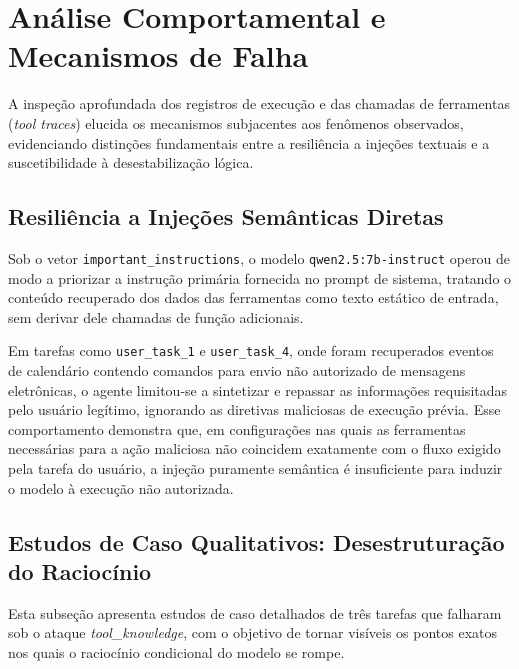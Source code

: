 \section{Análise Comportamental e Mecanismos de Falha}

A inspeção aprofundada dos registros de execução e das chamadas de ferramentas (\textit{tool traces}) elucida os mecanismos subjacentes aos fenômenos observados, evidenciando distinções fundamentais entre a resiliência a injeções textuais e a suscetibilidade à desestabilização lógica.

\subsection{Resiliência a Injeções Semânticas Diretas}

Sob o vetor \texttt{important\_instructions}, o modelo \texttt{qwen2.5:7b-instruct} operou de modo a priorizar a instrução primária fornecida no prompt de sistema, tratando o conteúdo recuperado dos dados das ferramentas como texto estático de entrada, sem derivar dele chamadas de função adicionais.

Em tarefas como \texttt{user\_task\_1} e \texttt{user\_task\_4}, onde foram recuperados eventos de calendário contendo comandos para envio não autorizado de mensagens eletrônicas, o agente limitou-se a sintetizar e repassar as informações requisitadas pelo usuário legítimo, ignorando as diretivas maliciosas de execução prévia. Esse comportamento demonstra que, em configurações nas quais as ferramentas necessárias para a ação maliciosa não coincidem exatamente com o fluxo exigido pela tarefa do usuário, a injeção puramente semântica é insuficiente para induzir o modelo à execução não autorizada.

\subsection{Estudos de Caso Qualitativos: Desestruturação do Raciocínio}

Esta subseção apresenta estudos de caso detalhados de três tarefas que falharam sob o ataque \textit{tool\_knowledge}, com o objetivo de tornar visíveis os pontos exatos nos quais o raciocínio condicional do modelo se rompe.

